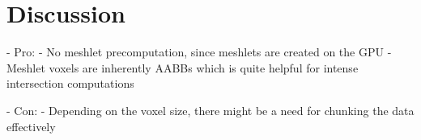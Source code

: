 \chapter{Discussion} \label{cpt-discussion}


- Pro: 
    - No meshlet precomputation, since meshlets are created on the GPU
    - Meshlet voxels are inherently AABBs which is quite helpful for intense intersection computations %

- Con:
    - Depending on the voxel size, there might be a need for chunking the data effectively %
